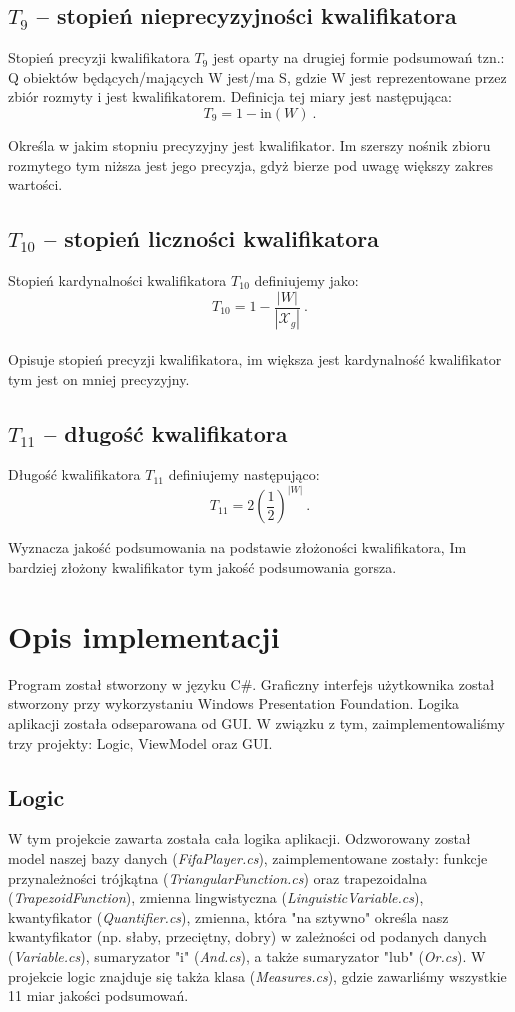 \documentclass{classrep}
\begin{document}
\subsection{\(T_9\) -- stopień nieprecyzyjności kwalifikatora}
Stopień precyzji kwalifikatora \(T_9\) jest oparty na drugiej formie podsumowań tzn.: Q obiektów będących/mających W jest/ma S, gdzie W jest reprezentowane przez zbiór rozmyty i jest kwalifikatorem. Definicja tej miary jest następująca:
\[T_9 = 1-\mathrm{in}(W) ~\mbox{.}\]

Określa w jakim stopniu precyzyjny jest kwalifikator. Im szerszy nośnik zbioru rozmytego tym niższa jest jego precyzja, gdyż bierze pod uwagę większy zakres wartości. 


\subsection{\(T_{10}\) -- stopień liczności kwalifikatora}
Stopień kardynalności kwalifikatora \(T_{10}\) definiujemy jako:
\[T_{10} = 1-\frac{|W|}{|\mathcal{X}_g|} ~\mbox{.}\]\\

Opisuje stopień precyzji kwalifikatora, im większa jest kardynalność kwalifikator tym jest on mniej precyzyjny.

\subsection{\(T_{11}\) -- długość kwalifikatora}
Długość kwalifikatora \(T_{11}\) definiujemy następująco:
\[T_{11} = 2\left(\frac{1}{2}\right)^{|W|} ~\mbox{.}\]

Wyznacza jakość podsumowania na podstawie złożoności kwalifikatora, Im bardziej złożony kwalifikator tym jakość podsumowania gorsza.

\vspace\baselineskip

\section{Opis implementacji}
Program został stworzony w języku C\#. Graficzny interfejs użytkownika został stworzony przy  wykorzystaniu Windows Presentation Foundation. Logika aplikacji została odseparowana od GUI. W związku z tym, zaimplementowaliśmy trzy projekty: Logic, ViewModel oraz GUI.

\subsection{Logic}
W tym projekcie zawarta została cała logika aplikacji. Odzworowany został model naszej bazy danych (\emph{FifaPlayer.cs}), zaimplementowane zostały: funkcje przynależności trójkątna (\emph{TriangularFunction.cs}) oraz trapezoidalna (\emph{TrapezoidFunction}), zmienna lingwistyczna (\emph{LinguisticVariable.cs}), kwantyfikator (\emph{Quantifier.cs}), zmienna, która "na sztywno" określa nasz kwantyfikator (np. słaby, przeciętny, dobry) w zależności od podanych danych (\emph{Variable.cs}), sumaryzator "i" (\emph{And.cs}), a także sumaryzator "lub" (\emph{Or.cs}). W projekcie logic znajduje się takża klasa (\emph{Measures.cs}), gdzie zawarliśmy wszystkie 11 miar jakości podsumowań.
 
\end{document}
